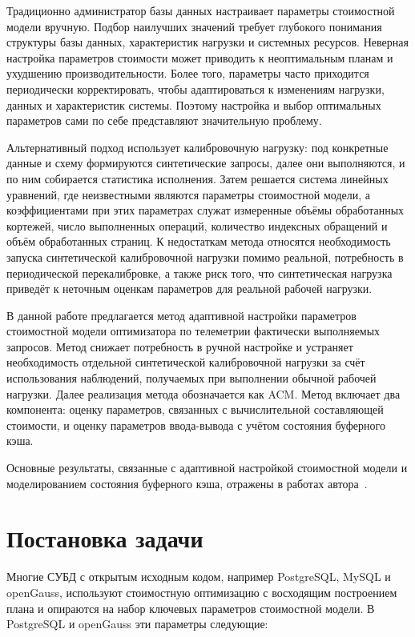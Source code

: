 Традиционно администратор базы данных настраивает параметры стоимостной модели вручную. Подбор наилучших значений требует глубокого понимания структуры базы данных, характеристик нагрузки и системных ресурсов. Неверная настройка параметров стоимости может приводить к неоптимальным планам и ухудшению производительности. Более того, параметры часто приходится периодически корректировать, чтобы адаптироваться к изменениям нагрузки, данных и характеристик системы. Поэтому настройка и выбор оптимальных параметров сами по себе представляют значительную проблему.

Альтернативный подход использует калибровочную нагрузку: под конкретные данные и схему формируются синтетические запросы, далее они выполняются, и по ним собирается статистика исполнения. Затем решается система линейных уравнений, где неизвестными являются параметры стоимостной модели, а коэффициентами при этих параметрах служат измеренные объёмы обработанных кортежей, число выполненных операций, количество индексных обращений и объём обработанных страниц. К недостаткам метода относятся необходимость запуска синтетической калибровочной нагрузки помимо реальной, потребность в периодической перекалибровке, а также риск того, что синтетическая нагрузка приведёт к неточным оценкам параметров для реальной рабочей нагрузки.

В данной работе предлагается метод адаптивной настройки параметров стоимостной модели оптимизатора по телеметрии фактически выполняемых запросов. Метод снижает потребность в ручной настройке и устраняет необходимость отдельной синтетической калибровочной нагрузки за счёт использования наблюдений, получаемых при выполнении обычной рабочей нагрузки. Далее реализация метода обозначается как ACM. Метод включает два компонента: оценку параметров, связанных с вычислительной составляющей стоимости, и оценку параметров ввода-вывода с учётом состояния буферного кэша. 

Основные результаты, связанные с адаптивной настройкой стоимостной модели и моделированием состояния буферного кэша, отражены в работах автора~\cite{vasilenko2024acm}.

\section{Постановка задачи}

Многие СУБД с открытым исходным кодом, например PostgreSQL, MySQL и openGauss, используют стоимостную оптимизацию с восходящим построением плана и опираются на набор ключевых параметров стоимостной модели. В PostgreSQL и openGauss эти параметры следующие:

